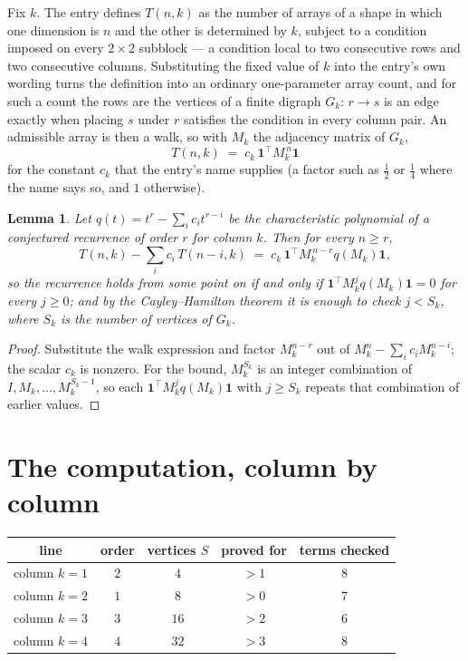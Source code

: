 \documentclass[11pt,a4paper]{article}
\theoremstyle{plain}
\newtheorem{lemma}[theorem]{Lemma}
\theoremstyle{definition}
\begin{document}
Fix $k$. The entry defines $T(n,k)$ as the number of arrays of a shape in which one dimension
is $n$ and the other is determined by $k$, subject to a condition imposed on every
$2\times2$ subblock --- a condition local to two consecutive rows and two consecutive columns.
Substituting the fixed value of $k$ into the entry's own wording turns the definition into an
ordinary one-parameter array count, and for such a count the rows are the vertices of a finite
digraph $G_k$: $r\to s$ is an edge exactly when placing $s$ under $r$ satisfies the condition
in every column pair. An admissible array is then a walk, so with $M_k$ the adjacency matrix
of $G_k$,
\[
T(n,k)\;=\;c_k\,\mathbf{1}^{\!\top}M_k^{\,n}\mathbf{1}
\]
for the constant $c_k$ that the entry's name supplies (a factor such as $\tfrac12$ or
$\tfrac14$ where the name says so, and $1$ otherwise).

\begin{lemma}\label{lem:crit}
Let $q(t)=t^{r}-\sum_i c_it^{r-i}$ be the characteristic polynomial of a conjectured
recurrence of order $r$ for column $k$. Then for every $n\ge r$,
\[
T(n,k)-\sum_i c_i\,T(n-i,k)\;=\;c_k\,\mathbf{1}^{\!\top}M_k^{\,n-r}q(M_k)\mathbf{1},
\]
so the recurrence holds from some point on if and only if
$\mathbf{1}^{\!\top}M_k^{j}q(M_k)\mathbf{1}=0$ for every $j\ge0$; and by the
Cayley--Hamilton theorem it is enough to check $j<S_k$, where $S_k$ is the number of vertices
of $G_k$.
\end{lemma}

\begin{proof}
Substitute the walk expression and factor $M_k^{n-r}$ out of $M_k^{n}-\sum_ic_iM_k^{n-i}$;
the scalar $c_k$ is nonzero. For the bound, $M_k^{S_k}$ is an integer combination of
$I,M_k,\dots,M_k^{S_k-1}$, so each $\mathbf{1}^{\!\top}M_k^{j}q(M_k)\mathbf{1}$ with
$j\ge S_k$ repeats that combination of earlier values.
\end{proof}

\section{The computation, column by column}

\begin{center}
\begin{tabular}{ccccc}
line & order & vertices $S$ & proved for & terms checked \\ \hline
column $k$$=1$ & $2$ & $4$ & $>1$ & $8$ \\
column $k$$=2$ & $1$ & $8$ & $>0$ & $7$ \\
column $k$$=3$ & $3$ & $16$ & $>2$ & $6$ \\
column $k$$=4$ & $4$ & $32$ & $>3$ & $8$ \\
\end{tabular}
\end{center}
\end{document}
